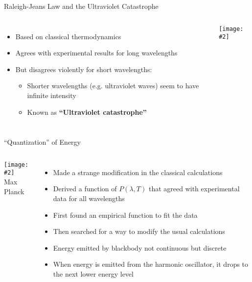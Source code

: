\documentclass[12pt,compress,aspectratio=169]{beamer}
\newcommand{\pic}[2]{\texttt{[image: \#2]}}
\newcommand{\eq}[2]{\vspace{#1}{\Large\begin{displaymath}#2\end{displaymath}}}
\begin{document}
\begin{frame}{Raleigh-Jeans Law and the Ultraviolet Catastrophe}
  \begin{columns}
    \begin{itemize}
    \item Based on classical thermodynamics
      
      \eq{-.35in}{
        P(\lambda,T)=8\pi kT\lambda^{-4}
      }

      \vspace{-.2in}{\footnotesize $T$=temperature, $\lambda$=wavelength,
        $k$=Boltzmann's constant}
    \item Agrees with experimental results for long wavelengths
    \item But disagrees violently for short wavelengths:
      \begin{itemize}
      \item Shorter wavelengths (e.g. ultraviolet waves) seem to have infinite
        intensity
      \item Known as \textbf{``Ultraviolet catastrophe''}
      \end{itemize}
    \end{itemize}

    \pic{1}{1280px-Black_body.png}
  \end{columns}
\end{frame}



\begin{frame}{``Quantization'' of Energy}
  \begin{columns}
    \pic{1}{20973-050-F6EEBFF1.jpg}\\
    Max Planck
    
    \begin{itemize}
    \item Made a strange modification in the classical calculations
    \item Derived a function of $P(\lambda,T)$ that agreed with experimental
      data for all wavelengths
    \item First found an empirical function to fit the data
    \item Then searched for a way to modify the usual calculations
    \item Energy emitted by blackbody not continuous but discrete
    \item When energy is emitted from the harmonic oscillator, it drops to the
      next lower energy level 
    \end{itemize}
  \end{columns}
\end{frame}
\end{document}
